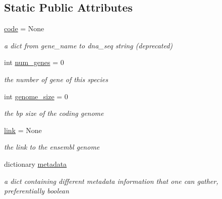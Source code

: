 \subsection*{Static Public Attributes}
\begin{DoxyCompactItemize}
\item 
\mbox{\label{class_py_c_u_b_1_1espece_1_1_espece_a143141fe25ea32dc24abd314a0f5fdbd}} 
\mbox{\hyperlink{class_py_c_u_b_1_1espece_1_1_espece_a143141fe25ea32dc24abd314a0f5fdbd}{code}} = None
\begin{DoxyCompactList}\small\item\em a dict from gene\+\_\+name to dna\+\_\+seq string (deprecated) \end{DoxyCompactList}\item 
\mbox{\label{class_py_c_u_b_1_1espece_1_1_espece_adb2006eee970b43f6abe9554690cb424}} 
int \mbox{\hyperlink{class_py_c_u_b_1_1espece_1_1_espece_adb2006eee970b43f6abe9554690cb424}{num\+\_\+genes}} = 0
\begin{DoxyCompactList}\small\item\em the number of gene of this species \end{DoxyCompactList}\item 
\mbox{\label{class_py_c_u_b_1_1espece_1_1_espece_ad40242dc0031d44de4c363bd716489e2}} 
int \mbox{\hyperlink{class_py_c_u_b_1_1espece_1_1_espece_ad40242dc0031d44de4c363bd716489e2}{genome\+\_\+size}} = 0
\begin{DoxyCompactList}\small\item\em the bp size of the coding genome \end{DoxyCompactList}\item 
\mbox{\label{class_py_c_u_b_1_1espece_1_1_espece_ae066a956b3f9f29d676162fbf9773a0f}} 
\mbox{\hyperlink{class_py_c_u_b_1_1espece_1_1_espece_ae066a956b3f9f29d676162fbf9773a0f}{link}} = None
\begin{DoxyCompactList}\small\item\em the link to the ensembl genome \end{DoxyCompactList}\item 
dictionary \mbox{\hyperlink{class_py_c_u_b_1_1espece_1_1_espece_ae98c1d182e761e4c09a10f8a9994124e}{metadata}}
\begin{DoxyCompactList}\small\item\em a dict containing different metadata information that one can gather, preferentially boolean \end{DoxyCompactList}\item 

\end{DoxyCompactItemize}
